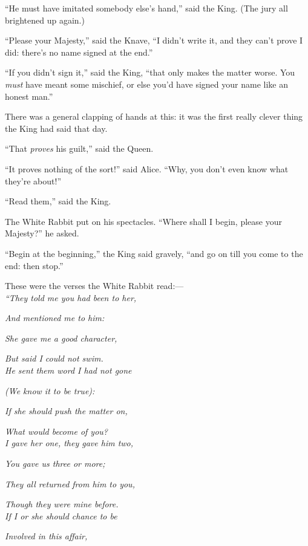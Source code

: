 \documentclass[book, 20pt]{extbook}
\begin{document}
``He must have imitated somebody else's hand,'' said the King. (The jury
all brightened up again.)

``Please your Majesty,'' said the Knave, ``I didn't write it, and they
can't prove I did: there's no name signed at the end.''

``If you didn't sign it,'' said the King, ``that only makes the matter
worse. You \emph{must} have meant some mischief, or else you'd have
signed your name like an honest man.''

There was a general clapping of hands at this: it was the first really
clever thing the King had said that day.

``That \emph{proves} his guilt,'' said the Queen.

``It proves nothing of the sort!'' said Alice. ``Why, you don't even
know what they're about!''

``Read them,'' said the King.

The White Rabbit put on his spectacles. ``Where shall I begin, please
your Majesty?'' he asked.

``Begin at the beginning,'' the King said gravely, ``and go on till you
come to the end: then stop.''

These were the verses the White Rabbit read:---\\
\bigskip
\noindent\emph{``They told me you had been to her,}

\emph{And mentioned me to him:\\}

\noindent\emph{She gave me a good character,}

\emph{But said I could not swim.\\}
\bigskip
\noindent\emph{He sent them word I had not gone}

\emph{(We know it to be true):\\}

\noindent\emph{If she should push the matter on,}

\emph{What would become of you?\\}
\bigskip
\noindent\emph{I gave her one, they gave him two,}

\emph{You gave us three or more;\\}

\noindent\emph{They all returned from him to you,}

\emph{Though they were mine before.\\}
\bigskip
\noindent\emph{If I or she should chance to be}

\emph{Involved in this affair,\\}
\end{document}
